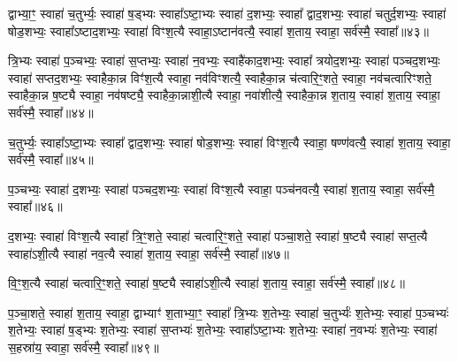 {\anuvakamend[{एक॑स्मै त्रि॒भ्यः प॑ञ्चा॒शत्॥12॥}]}

द्वाभ्या॒ꣳ॒ स्वाहा॑ च॒तुर्भ्यः॒ स्वाहा॑ ष॒ड्भ्यः स्वाहा᳚\-ऽष्टा॒भ्यः स्वाहा॑ द॒शभ्यः॒ स्वाहा᳚ द्वाद॒शभ्यः॒ स्वाहा॑ चतुर्द॒शभ्यः॒ स्वाहा॑ षोड॒शभ्यः॒ स्वाहा᳚\-ऽष्टाद॒शभ्यः॒ स्वाहा॑ विꣳश॒त्यै स्वाहा॒\-ऽष्टान॑वत्यै॒ स्वाहा॑ श॒ताय॒ स्वाहा॒ सर्व॑स्मै॒ स्वाहा᳚॥४३॥

{\anuvakamend[{द्वाभ्या॑म॒ष्टान॑वत्यै॒ षड्विꣳ॑शतिः॥13॥}]}

त्रि॒भ्यः स्वाहा॑ प॒ञ्चभ्यः॒ स्वाहा॑ स॒प्तभ्यः॒ स्वाहा॑ न॒वभ्यः॒ स्वाहै॑काद॒शभ्यः॒ स्वाहा᳚ त्रयोद॒शभ्यः॒ स्वाहा॑ पञ्चद॒शभ्यः॒ स्वाहा॑ सप्तद॒शभ्यः॒ स्वाहैका॒न्न विꣳ॑श॒त्यै स्वाहा॒ नव॑विꣳशत्यै॒ स्वाहैका॒न्न च॑त्वारि॒ꣳ॒शते॒ स्वाहा॒ नव॑चत्वारिꣳशते॒ स्वाहैका॒न्न ष॒ष्ट्यै स्वाहा॒ नव॑षष्ट्यै॒ स्वाहैका॒न्नाशी॒त्यै स्वाहा॒ नवा॑शीत्यै॒ स्वाहैका॒न्न श॒ताय॒ स्वाहा॑ श॒ताय॒ स्वाहा॒ सर्व॑स्मै॒ स्वाहा᳚॥४४॥

{\anuvakamend[{त्रि॒भ्यो᳚\-ऽष्टाचत्वारि॒ꣳ॒शत्॥14॥}]}

च॒तुर्भ्यः॒ स्वाहा᳚\-ऽष्टा॒भ्यः स्वाहा᳚ द्वाद॒शभ्यः॒ स्वाहा॑ षोड॒शभ्यः॒ स्वाहा॑ विꣳश॒त्यै स्वाहा॒ षण्ण॑वत्यै॒ स्वाहा॑ श॒ताय॒ स्वाहा॒ सर्व॑स्मै॒ स्वाहा᳚॥४५॥

{\anuvakamend[{च॒तुर्भ्यः॒ षण्ण॑वत्यै॒ षोड॑श॥15॥}]}

प॒ञ्चभ्यः॒ स्वाहा॑ द॒शभ्यः॒ स्वाहा॑ पञ्चद॒शभ्यः॒ स्वाहा॑ विꣳश॒त्यै स्वाहा॒ पञ्च॑नवत्यै॒ स्वाहा॑ श॒ताय॒ स्वाहा॒ सर्व॑स्मै॒ स्वाहा᳚॥४६॥

{\anuvakamend[{प॒ञ्चभ्यः॒ प़ञ्च॑नवत्यै॒ चतु॑र्दश॥16॥}]}

द॒शभ्यः॒ स्वाहा॑ विꣳश॒त्यै स्वाहा᳚ त्रि॒ꣳ॒शते॒ स्वाहा॑ चत्वारि॒ꣳ॒शते॒ स्वाहा॑ पञ्चा॒शते॒ स्वाहा॑ ष॒ष्ट्यै स्वाहा॑ सप्त॒त्यै स्वाहा॑\-ऽशी॒त्यै स्वाहा॑ नव॒त्यै स्वाहा॑ श॒ताय॒ स्वाहा॒ सर्व॑स्मै॒ स्वाहा᳚॥४७॥

{\anuvakamend[{द॒शभ्यो॒ द्वाविꣳ॑शतिः॥17॥}]}

वि॒ꣳ॒श॒त्यै स्वाहा॑ चत्वारि॒ꣳ॒शते॒ स्वाहा॑ ष॒ष्ट्यै स्वाहा॑\-ऽशी॒त्यै स्वाहा॑ श॒ताय॒ स्वाहा॒ सर्व॑स्मै॒ स्वाहा᳚॥४८॥

{\anuvakamend[{वि॒ꣳ॒श॒त्यै द्वाद॑श॥18॥}]}

प॒ञ्चा॒शते॒ स्वाहा॑ श॒ताय॒ स्वाहा॒ द्वाभ्याꣳ॑ श॒ताभ्या॒ꣳ॒ स्वाहा᳚ त्रि॒भ्यः श॒तेभ्यः॒ स्वाहा॑ च॒तुर्भ्यः॑ श॒तेभ्यः॒ स्वाहा॑ प॒ञ्चभ्यः॑ श॒तेभ्यः॒ स्वाहा॑ ष॒ड्भ्यः श॒तेभ्यः॒ स्वाहा॑ स॒प्तभ्यः॑ श॒तेभ्यः॒ स्वाहा᳚\-ऽष्टा॒भ्यः श॒तेभ्यः॒ स्वाहा॑ न॒वभ्यः॑ श॒तेभ्यः॒ स्वाहा॑ स॒हस्रा॑य॒ स्वाहा॒ सर्व॑स्मै॒ स्वाहा᳚॥४९॥


